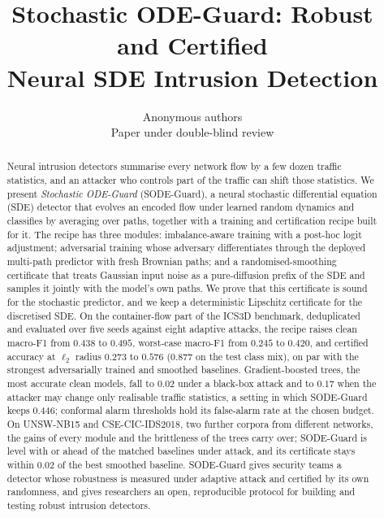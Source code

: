 \documentclass{article}
\title{Stochastic ODE-Guard: Robust and Certified\\Neural SDE Intrusion Detection}
\author{Anonymous authors\\Paper under double-blind review}
\theoremstyle{definition}
\begin{document}
\maketitle

\begin{abstract}
Neural intrusion detectors summarise every network flow by a few dozen traffic
statistics, and an attacker who controls part of the traffic can shift those
statistics. We present \emph{Stochastic ODE-Guard} (SODE-Guard), a neural
stochastic differential equation (SDE) detector that evolves an encoded flow
under learned random dynamics and classifies by averaging over paths, together
with a training and certification recipe built for it. The recipe has three
modules: imbalance-aware training with a post-hoc logit adjustment; adversarial
training whose adversary differentiates through the deployed multi-path
predictor with fresh Brownian paths; and a randomised-smoothing certificate
that treats Gaussian input noise as a pure-diffusion prefix of the SDE and
samples it jointly with the model's own paths. We prove that this certificate
is sound for the stochastic predictor, and we keep a deterministic Lipschitz
certificate for the discretised SDE. On the container-flow part of the ICS3D
benchmark, deduplicated and evaluated over five seeds against eight adaptive
attacks, the recipe raises clean macro-F1 from $0.438$ to $0.495$, worst-case
macro-F1 from $0.245$ to $0.420$, and certified accuracy at $\ell_2$ radius
$0.273$ to $0.576$ ($0.877$ on the test class mix), on par with the strongest
adversarially trained and smoothed baselines. Gradient-boosted trees, the most
accurate clean models, fall to $0.02$ under a black-box attack and to $0.17$
when the attacker may change only realisable traffic statistics, a setting in
which SODE-Guard keeps $0.446$; conformal alarm thresholds hold its false-alarm
rate at the chosen budget. On UNSW-NB15 and CSE-CIC-IDS2018, two further corpora
from different networks, the gains of every module and the brittleness of the
trees carry over; SODE-Guard is level with or ahead of the matched baselines
under attack, and its certificate stays within $0.02$ of the best smoothed
baseline.
SODE-Guard gives security teams a detector whose robustness is measured under
adaptive attack and certified by its own randomness, and gives researchers an
open, reproducible protocol for building and testing robust intrusion detectors.
\end{abstract}

\end{document}
